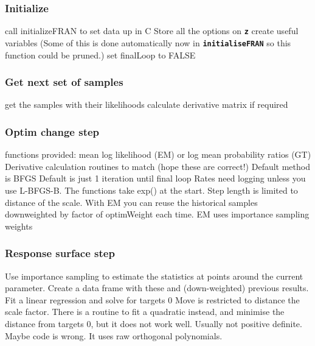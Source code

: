 \documentclass[12pt, a4paper]{article}
\renewcommand{\=}{\,=\,}
\newcommand{\+}{\,+\,}
\newcommand{\sfn}[1]{\textbf{\texttt{#1}}}
\begin{document}
\subsubsection{Initialize}
\label{sec:init}
\begin{algorithmic}
\STATE call initializeFRAN to set data up in C
\STATE Store all the options on \sfn{z}
\STATE create useful variables (Some of this is done automatically now in
  \sfn{initialiseFRAN} so this function could be pruned.)
\STATE set finalLoop to FALSE
\end{algorithmic}
\subsubsection{Get next set of samples}
\label{sec:samples}
\begin{algorithmic}
\STATE get the samples with their likelihoods
\STATE calculate derivative matrix if required
\end{algorithmic}
\subsubsection{Optim change step}
\label{sec:optim}
\begin{algorithmic}
 functions provided: mean log likelihood (EM) or log mean
probability ratios (GT)
\STATE Derivative calculation routines to match (hope these are correct!)
\STATE Default method is BFGS
\STATE Default is just 1 iteration until final loop
\STATE Rates need logging unless you use L-BFGS-B. The functions take exp() at
the start.
\STATE Step length is limited to distance of the scale.
\STATE With EM you can reuse the historical samples downweighted by factor of
optimWeight each time.
\STATE EM uses importance sampling weights
\end{algorithmic}
\subsubsection{Response surface step}
\label{sec:resp}
\begin{algorithmic}
\STATE Use importance sampling to estimate the statistics at points around the
current parameter.
\STATE Create a data frame with these and (down-weighted) previous results.
\STATE Fit a linear regression and solve for targets 0
\STATE Move is restricted to distance the scale factor.
\STATE There is a routine to fit a quadratic instead, and minimise the distance
from targets 0, but it does not work well. Usually not positive definite. Maybe
code is wrong. It uses raw orthogonal polynomials.
\end{algorithmic}
\end{document}
